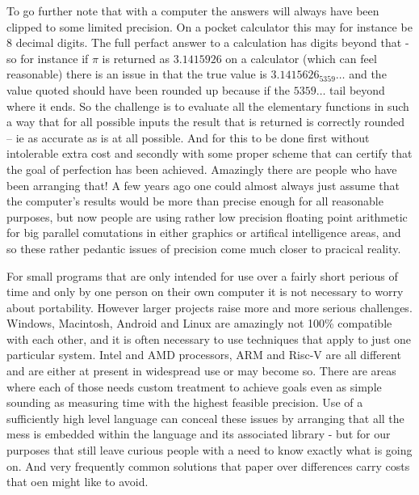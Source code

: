 \begin{longdescription}
To go further note that with a computer the answers will always have been
clipped to some limited precision. On a pocket calculator this may for
instance be 8 decimal digits. The full perfact answer to a calculation has
digits beyond that - so for instance if $\pi$ is returned as $3.1415926$ on
a calculator (which can feel reasonable) there is an issue in that the
true value is $3.1415626_5359\ldots$ and the value quoted should have been 
rounded up because if the $5359\ldots$ tail beyond where it ends. So the
challenge is to evaluate all the elementary functions in such a way that
for all possible inputs the result that is returned is correctly rounded 
-- ie as accurate as is at all possible. And for this to be done first 
without intolerable extra cost and secondly with some proper scheme that 
can certify that the goal of perfection has been achieved. Amazingly there 
are people who have been arranging that! A few years ago one could almost
always just assume that the computer's results would be more than precise
enough for all reasonable purposes, but now people are using rather
low precision floating point arithmetic for big parallel comutations in
either graphics or artifical intelligence areas, and so these rather pedantic
issues of precision come much closer to pracical reality.

\item[Portability]

For small programs that are only intended for use over a fairly short
perious of time and only by one person on their own computer it is
not necessary to worry about portability. However larger projects
raise more and more serious challenges. Windows, Macintosh, Android and
Linux are amazingly not 100\% compatible with each other, and it is often
necessary to use techniques that apply to just one particular system.
Intel and AMD processors, ARM and Risc-V are all different and are either
at present in widespread use or may become so. There are areas where each
of those needs custom treatment to achieve goals even as simple sounding as
measuring time with the highest feasible precision. Use of a sufficiently
high level language can conceal these issues by arranging that all the mess
is embedded within the language and its associated library - but for our
purposes that still leave curious people with a need to know exactly what
is going on. And very frequently common solutions that paper over differences
carry costs that oen might like to avoid.

\item[Demand the fastest (or most compact) solution that could  
ever exist.]


\end{longdescription}
